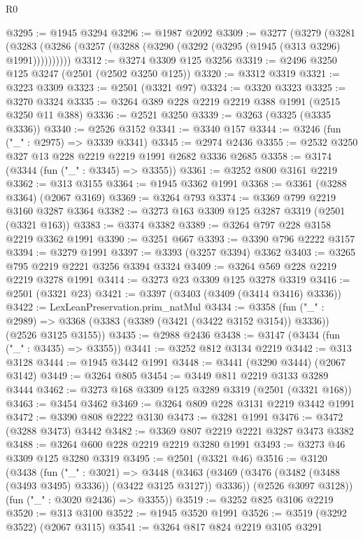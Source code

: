 \begin{lexlean}{R0}
\begin{coremodule}
@3295 := @1945 @3294
@3296 := @1987 @2092
@3309 := @3277
    (@3279
      (@3281 (@3283 (@3286 (@3257 (@3288 (@3290 (@3292 (@3295 (@1945 (@313 @3296) @1991))))))))))
@3312 := @3274 @3309 @125 @3256
@3319 := @2496 @3250 @125 @3247 (@2501 (@2502 @3250 @125))
@3320 := @3312 @3319
@3321 := @3223 @3309
@3323 := @2501 (@3321 @97)
@3324 := @3320 @3323
@3325 := @3270 @3324
@3335 := @3264 @389 @228 @2219 @2219 @388 @1991 (@2515 @3250 @11 @388)
@3336 := @2521 @3250
@3339 := @3263 (@3325 (@3335 @3336))
@3340 := @2526 @3152
@3341 := @3340 @157
@3344 := @3246 (fun ("_" : @2975) => @3339 @3341)
@3345 := @2974 @2436
@3355 := @2532 @3250 @327 @13 @228 @2219 @2219 @1991 @2682 @3336 @2685
@3358 := @3174 (@3344 (fun ("_" : @3345) => @3355))
@3361 := @3252 @800 @3161 @2219
@3362 := @313 @3155
@3364 := @1945 @3362 @1991
@3368 := @3361 (@3288 @3364) (@2067 @3169)
@3369 := @3264 @793
@3374 := @3369 @799 @2219 @3160 @3287 @3364
@3382 := @3273 @163 @3309 @125 @3287 @3319 (@2501 (@3321 @163))
@3383 := @3374 @3382
@3389 := @3264 @797 @228 @3158 @2219 @3362 @1991
@3390 := @3251 @667
@3393 := @3390 @796 @2222 @3157
@3394 := @3279 @1991
@3397 := @3393 (@3257 @3394) @3362
@3403 := @3265 @795 @2219 @2221 @3256 @3394 @3324
@3409 := @3264 @569 @228 @2219 @2219 @3278 @1991
@3414 := @3273 @23 @3309 @125 @3278 @3319
@3416 := @2501 (@3321 @23)
@3421 := @3397 (@3403 (@3409 (@3414 @3416) @3336))
@3422 := LexLeanPreservation.prim_natMul
@3434 := @3358
    (fun ("_" : @2989) =>
    @3368 (@3383 (@3389 (@3421 (@3422 @3152 @3154)) @3336)) (@2526 @3125 @3155))
@3435 := @2988 @2436
@3438 := @3147 (@3434 (fun ("_" : @3435) => @3355))
@3441 := @3252 @812 @3134 @2219
@3442 := @313 @3128
@3444 := @1945 @3442 @1991
@3448 := @3441 (@3290 @3444) (@2067 @3142)
@3449 := @3264 @805
@3454 := @3449 @811 @2219 @3133 @3289 @3444
@3462 := @3273 @168 @3309 @125 @3289 @3319 (@2501 (@3321 @168))
@3463 := @3454 @3462
@3469 := @3264 @809 @228 @3131 @2219 @3442 @1991
@3472 := @3390 @808 @2222 @3130
@3473 := @3281 @1991
@3476 := @3472 (@3288 @3473) @3442
@3482 := @3369 @807 @2219 @2221 @3287 @3473 @3382
@3488 := @3264 @600 @228 @2219 @2219 @3280 @1991
@3493 := @3273 @46 @3309 @125 @3280 @3319
@3495 := @2501 (@3321 @46)
@3516 := @3120
    (@3438
      (fun ("_" : @3021) =>
      @3448
        (@3463 (@3469 (@3476 (@3482 (@3488 (@3493 @3495) @3336)) (@3422 @3125 @3127)) @3336))
        (@2526 @3097 @3128))
      (fun ("_" : @3020 @2436) => @3355))
@3519 := @3252 @825 @3106 @2219
@3520 := @313 @3100
@3522 := @1945 @3520 @1991
@3526 := @3519 (@3292 @3522) (@2067 @3115)
@3541 := @3264
    @817
    @824
    @2219
    @3105
    @3291

\end{coremodule}
\end{lexlean}
